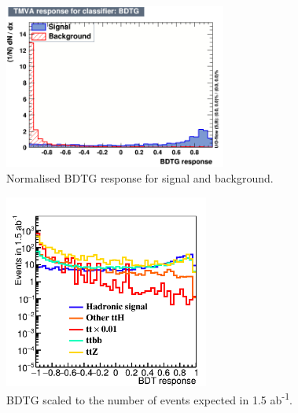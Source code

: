 \begin{figure}[h]
	\centering
	\includegraphics[width=0.65\textwidth]{../Pictures/Analysis/BDTs/mva_BDTG.png}
	\caption{Normalised BDTG response for signal and background.}
	\label{figure:analysis/results/bdt-response}
\end{figure}

\begin{figure}[h]
	\centering
	\includegraphics[width=0.60\textwidth]{../Pictures/Analysis/BDTs/MVA_BDTG_comb_had.png}
	\caption{BDTG scaled to the number of events expected in 1.5 ab\textsuperscript{-1}.}
	\label{figure:analysis/results/bdt-response}
\end{figure}




